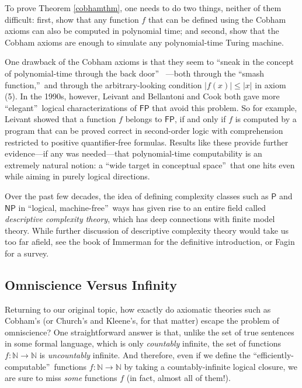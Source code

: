 \documentclass[12pt,onecolumn]{article}%
\begin{document}
To prove Theorem \ref{cobhamthm}, one needs to do two things, neither of them
difficult: first, show that any function $f$ that can be defined using the
Cobham axioms can also be computed in polynomial time; and second, show that
the Cobham axioms are enough to simulate any polynomial-time Turing machine.

One drawback of the Cobham axioms is that they seem to \textquotedblleft sneak
in the concept of polynomial-time through the back door\textquotedblright\ %
---both through the \textquotedblleft smash function,\textquotedblright\  and
through the arbitrary-looking condition $\left\vert f\left(  x\right)
\right\vert \leq\left\vert x\right\vert $ in axiom (5). In the 1990s,
however, Leivant \cite{leivant} and Bellantoni and Cook \cite{bellantonicook}
both gave more \textquotedblleft elegant\textquotedblright\  logical
characterizations of $\mathsf{FP}$ that avoid this problem. So for example,
Leivant showed that a function $f$ belongs to $\mathsf{FP}$, if and only if
$f$ is computed by a program that can be proved correct in second-order logic
with comprehension restricted to positive quantifier-free formulas. Results
like these provide further evidence---if any was needed---that polynomial-time
computability is an extremely natural notion: a \textquotedblleft wide target
in conceptual space\textquotedblright\  that one hits even while aiming in
purely logical directions.

Over the past few decades, the idea of defining complexity classes such as
$\mathsf{P}$ and $\mathsf{NP}$ in \textquotedblleft logical,
machine-free\textquotedblright\  ways has given rise to an entire field called
\textit{descriptive complexity theory}, which has deep connections with finite
model theory. While further discussion of descriptive complexity theory
would take us too far afield, see the book of Immerman \cite{immerman} for
the definitive introduction, or Fagin \cite{fagin} for a survey.

\subsection{Omniscience Versus Infinity\label{OMNIINF}}

Returning to our original topic, how exactly do axiomatic theories such as
Cobham's (or Church's and Kleene's, for that matter) escape the problem of
omniscience? One straightforward answer is that, unlike the set of true
sentences in some formal language, which is only \textit{countably} infinite,
the set of functions $f:\mathbb{N}\rightarrow\mathbb{N}$ is
\textit{uncountably} infinite. And therefore, even if we define the
\textquotedblleft efficiently-computable\textquotedblright\  functions
$f:\mathbb{N}\rightarrow\mathbb{N}$ by taking a countably-infinite logical
closure, we are sure to miss \textit{some} functions $f$ (in fact, almost all
of them!).
\end{document}
